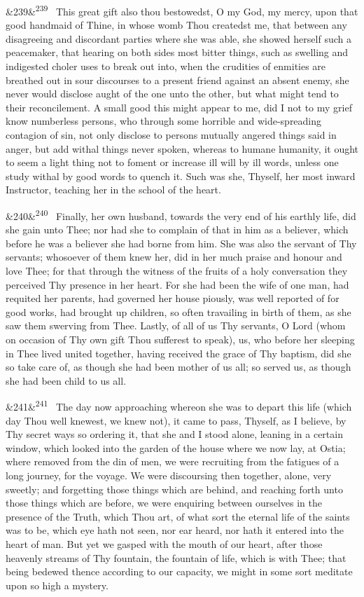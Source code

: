 \documentclass[12pt]{article}
\newcommand{\para}[1][]{\par\noindent\ifx&#1&\else\textsuperscript{\footnotesize #1}~\fi}
\begin{document}
\para[239] This great gift also thou bestowedst, O my God, my mercy, upon that good handmaid of Thine, in whose womb Thou createdst me, that between any disagreeing and discordant parties where she was able, she showed herself such a peacemaker, that hearing on both sides most bitter things, such as swelling and indigested choler uses to break out into, when the crudities of enmities are breathed out in sour discourses to a present friend against an absent enemy, she never would disclose aught of the one unto the other, but what might tend to their reconcilement. A small good this might appear to me, did I not to my grief know numberless persons, who through some horrible and wide-spreading contagion of sin, not only disclose to persons mutually angered things said in anger, but add withal things never spoken, whereas to humane humanity, it ought to seem a light thing not to foment or increase ill will by ill words, unless one study withal by good words to quench it. Such was she, Thyself, her most inward Instructor, teaching her in the school of the heart.

\para[240] Finally, her own husband, towards the very end of his earthly life, did she gain unto Thee; nor had she to complain of that in him as a believer, which before he was a believer she had borne from him. She was also the servant of Thy servants; whosoever of them knew her, did in her much praise and honour and love Thee; for that through the witness of the fruits of a holy conversation they perceived Thy presence in her heart. For she had been the wife of one man, had requited her parents, had governed her house piously, was well reported of for good works, had brought up children, so often travailing in birth of them, as she saw them swerving from Thee. Lastly, of all of us Thy servants, O Lord (whom on occasion of Thy own gift Thou sufferest to speak), us, who before her sleeping in Thee lived united together, having received the grace of Thy baptism, did she so take care of, as though she had been mother of us all; so served us, as though she had been child to us all.

\para[241] The day now approaching whereon she was to depart this life (which day Thou well knewest, we knew not), it came to pass, Thyself, as I believe, by Thy secret ways so ordering it, that she and I stood alone, leaning in a certain window, which looked into the garden of the house where we now lay, at Ostia; where removed from the din of men, we were recruiting from the fatigues of a long journey, for the voyage. We were discoursing then together, alone, very sweetly; and forgetting those things which are behind, and reaching forth unto those things which are before, we were enquiring between ourselves in the presence of the Truth, which Thou art, of what sort the eternal life of the saints was to be, which eye hath not seen, nor ear heard, nor hath it entered into the heart of man. But yet we gasped with the mouth of our heart, after those heavenly streams of Thy fountain, the fountain of life, which is with Thee; that being bedewed thence according to our capacity, we might in some sort meditate upon so high a mystery.
\end{document}

